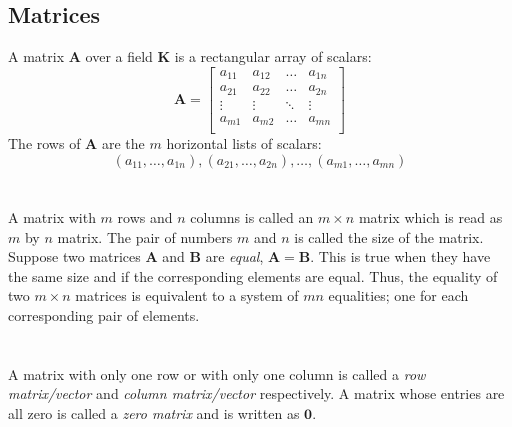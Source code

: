 \documentclass[../setup.tex]{subfiles}
\begin{document}
\subsection{Matrices}
A matrix $\bm{A}$ over a field $\bm{K}$ is a rectangular array of scalars:
\[\bm{A} =
\begin{bmatrix}
	a_{11} & a_{12} & \dots & a_{1n} \\
	a_{21} & a_{22} & \dots & a_{2n} \\
	\vdots & \vdots & \ddots & \vdots \\
	a_{m1} & a_{m2} & \dots & a_{mn} \\
\end{bmatrix}
\]
The rows of $\bm{A}$ are the $m$ horizontal lists of scalars:
\[(a_{11}, \dots, a_{1n}), 
(a_{21}, \dots, a_{2n}),
\dots,
(a_{m1}, \dots, a_{mn})\]
\phantom \\ \\
A matrix with $m$ rows and $n$ columns is called an $m \times n$ matrix which is read as $m$ by $n$ matrix. The pair of numbers $m$ and $n$ is called the size of the matrix. Suppose two matrices $\bm{A}$ and $\bm{B}$ are \textit{equal}, $\bm{A} = \bm{B}$. This is true when they have the same size and if the corresponding elements are equal. Thus, the equality of two $m \times n$ matrices is equivalent to a system of $mn$ equalities; one for each corresponding pair of elements. \\
\phantom \\ \\
A matrix with only one row or with only one column is called a \textit{row matrix/vector} and \textit{column matrix/vector} respectively. A matrix whose entries are all zero is called a \textit{zero matrix} and is written as $\bm{0}$. \\
\end{document}
